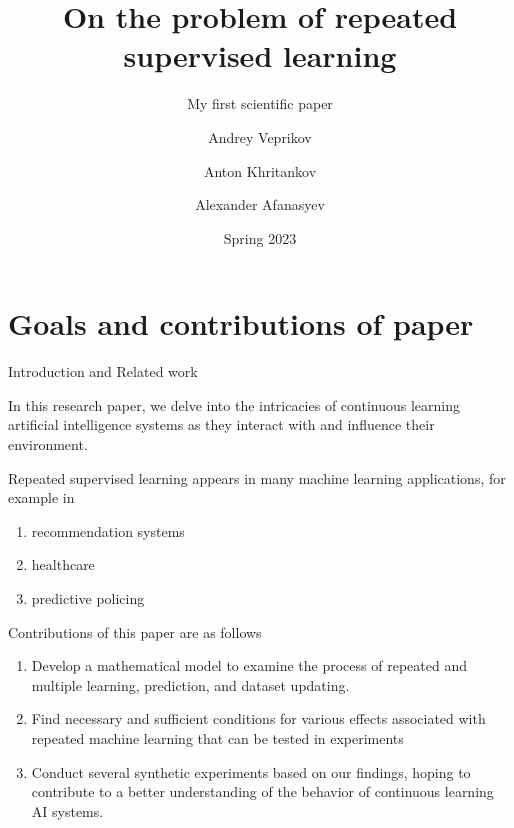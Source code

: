 \documentclass[10pt]{beamer}
\title[On the problem of repeated supervised learning]{On the problem of repeated supervised learning}
\subtitle{My first scientific paper}
\author[Andrey Veprikov]{Andrey Veprikov \and Anton Khritankov
\and Alexander Afanasyev}
\institute[veprikov.as@phystech.edu]{
MIPT\\
Dolgoprudny, Russia}
\date[Spring 2023]
{Spring 2023}
\begin{document}
\frame{\titlepage}
\section{Goals and contributions of paper}
    \begin{frame}{Introduction and Related work}

        In this research paper, we delve into the intricacies of continuous learning artificial intelligence systems as they interact with and influence their environment. 

        Repeated supervised learning appears in many machine learning applications, for example in 
        
        \begin{enumerate}
            \item recommendation systems \cite{khritankov2021existence}
    
            \item healthcare \cite{adam2020hidden}
    
            \item predictive policing \cite{ensign2018runaway}
        \end{enumerate}
        
        Contributions of this paper are as follows
        
        \begin{enumerate}
            \item Develop a mathematical model to examine the process of repeated and multiple learning, prediction, and dataset updating.
    
            \item Find necessary and sufficient conditions for various effects associated with repeated machine learning that can be tested in experiments
    
            \item Conduct several synthetic experiments based on our findings, hoping to contribute to a better understanding of the behavior of continuous learning AI systems.
        \end{enumerate}
        
    \end{frame}
\end{document}
